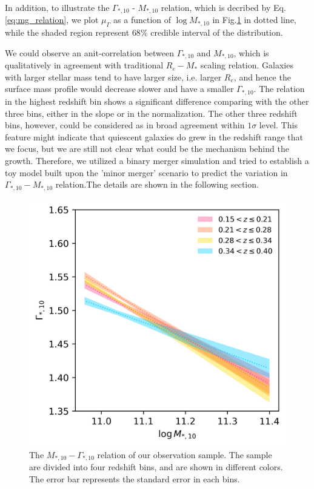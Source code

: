 \documentclass[fleqn,usenatbib]{mnras}
\begin{document}
In addition, to illustrate the $\Gamma_{*,10}$ - $M_{*,10}$ relation, which is decribed by Eq.\ref{eq:mg_relation}, we plot $\mu_\Gamma$ as a function of $\log M_{*,10}$ in Fig.\ref{fig:mg_relation} in dotted line, while the shaded region represent $68\%$ credible interval of the distribution. 
\par We could observe an anit-correlation between $\Gamma_{*,10}$ and $M_{*,10}$, which is qualitatively in agreement with traditional $R_e - M_*$ scaling relation. Galaxies with larger stellar mass tend to have larger size, i.e. larger $R_e$, and hence the surface mass profile would decrease slower and have a smaller $\Gamma_{*,10}$. The relation in the highest redshift bin shows a significant difference comparing with the other three bins, either in the slope or in the normalization. The other three redshift bins, however, could be considered as in broad agreement within $1 \sigma$ level. This feature might indicate that quiescent galaxies do grew in the redshift range that we focus, but we are still not clear what could be the mechanism behind the growth. Therefore, we utilized a binary merger simulation and tried to establish a toy model built upon the 'minor merger' scenario to predict the variation in $\Gamma_{*,10}- M_{*,10}$ relation.The details are shown in the following section. 
\begin{figure}
    \centering
    \includegraphics[width=\linewidth]{figure/mg_relation.png}
    \caption{The $M_{*,10} - \Gamma_{*,10}$ relation of our observation sample. The sample are divided into four redshift bins, and are shown in different colors. The error bar represents the standard error in each bins.}
    \label{fig:mg_relation}
\end{figure}
\end{document}
